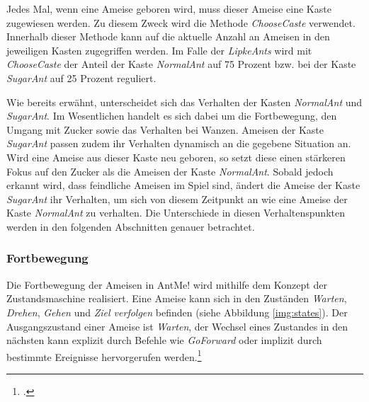 
Jedes Mal, wenn eine Ameise geboren wird, muss dieser Ameise eine Kaste zugewiesen werden. Zu diesem Zweck wird die Methode \textit{ChooseCaste} verwendet. Innerhalb dieser Methode kann auf die aktuelle Anzahl an Ameisen in den jeweiligen Kasten zugegriffen werden. Im Falle der \textit{LipkeAnts} wird mit \textit{ChooseCaste} der Anteil der Kaste \textit{NormalAnt} auf 75 Prozent bzw. bei der Kaste \textit{SugarAnt} auf 25 Prozent reguliert.


Wie bereits erwähnt, unterscheidet sich das Verhalten der Kasten \textit{NormalAnt} und \textit{SugarAnt}. Im Wesentlichen handelt es sich dabei um die Fortbewegung, den Umgang mit Zucker sowie das Verhalten bei Wanzen. Ameisen der Kaste \textit{SugarAnt} passen zudem ihr Verhalten dynamisch an die gegebene Situation an. Wird eine Ameise aus dieser Kaste neu geboren, so setzt diese einen stärkeren Fokus auf den Zucker als die Ameisen der Kaste \textit{NormalAnt}. Sobald jedoch erkannt wird, dass feindliche Ameisen im Spiel sind, ändert die Ameise der Kaste \textit{SugarAnt} ihr Verhalten, um sich von diesem Zeitpunkt an wie eine Ameise der Kaste \textit{NormalAnt} zu verhalten. Die Unterschiede in diesen Verhaltenspunkten werden in den folgenden Abschnitten genauer betrachtet.

\subsubsection{Fortbewegung}
Die Fortbewegung der Ameisen in AntMe! wird mithilfe dem Konzept der Zustandsmaschine realisiert. Eine Ameise kann sich in den Zuständen \textit{Warten}, \textit{Drehen}, \textit{Gehen} und \textit{Ziel verfolgen} befinden (siehe Abbildung \ref{img:states}). Der Ausgangszustand einer Ameise ist \textit{Warten}, der Wechsel eines Zustandes in den nächsten kann explizit durch Befehle wie \textit{GoForward} oder implizit durch bestimmte Ereignisse hervorgerufen werden.\footcite[Vgl.][]{AntMeWiki2}


